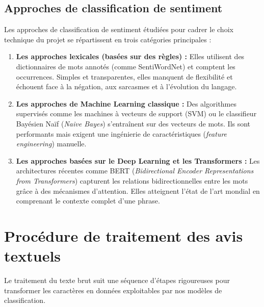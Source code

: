 \subsection{Approches de classification de sentiment}
Les approches de classification de sentiment étudiées pour cadrer le choix technique du projet se répartissent en trois catégories principales :
\begin{enumerate}
    \item \textbf{Les approches lexicales (basées sur des règles) :} Elles utilisent des dictionnaires de mots annotés (comme SentiWordNet) et comptent les occurrences. Simples et transparentes, elles manquent de flexibilité et échouent face à la négation, aux sarcasmes et à l'évolution du langage.
    \item \textbf{Les approches de Machine Learning classique :} Des algorithmes supervisés comme les machines à vecteurs de support (SVM) ou le classifieur Bayésien Naïf (\textit{Naive Bayes}) s'entraînent sur des vecteurs de mots. Ils sont performants mais exigent une ingénierie de caractéristiques (\textit{feature engineering}) manuelle.
    \item \textbf{Les approches basées sur le Deep Learning et les Transformers :} Les architectures récentes comme BERT (\textit{Bidirectional Encoder Representations from Transformers}) capturent les relations bidirectionnelles entre les mots grâce à des mécanismes d'attention. Elles atteignent l'état de l'art mondial en comprenant le contexte complet d'une phrase.
\end{enumerate}

\section{Procédure de traitement des avis textuels}

Le traitement du texte brut suit une séquence d'étapes rigoureuses pour transformer les caractères en données exploitables par nos modèles de classification.

